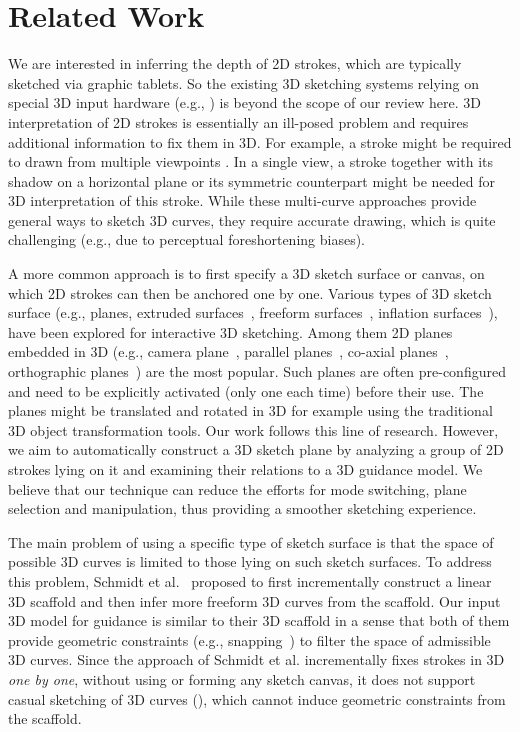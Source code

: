 \section{Related Work}
We are interested in inferring the depth of 2D strokes, which are typically sketched via graphic tablets. So the existing 3D sketching systems relying on special 3D input hardware (e.g., \cite{Sachs1991,Tsang2002}) is beyond the scope of our review here. 3D interpretation of 2D strokes is essentially an ill-posed problem and requires additional information to fix them in 3D. For example, a stroke might be required to drawn from multiple viewpoints \cite{Karpenko2004,bae2008ilovesketch,Rivers:2010}. %
In a single view, a stroke together with its shadow on a horizontal plane \cite{Cohen1999} or its symmetric counterpart \cite{bae2008ilovesketch} might be needed for 3D interpretation of this stroke. While these multi-curve approaches provide general ways to sketch 3D curves, they require accurate drawing, which is quite challenging (e.g., due to perceptual foreshortening biases).
%

A more common approach is to first specify a 3D sketch surface or canvas, on which 2D strokes can then be anchored one by one.
Various types of 3D sketch surface (e.g., planes, extruded surfaces~\cite{Tsang:2004,bae2008ilovesketch}, freeform surfaces~\cite{Kara2006,nealen2007fibermesh}, inflation surfaces~\cite{Grimm:2012}), have been explored for interactive 3D sketching. Among them 2D planes embedded in 3D (e.g., camera plane~\cite{bourguignon2001drawing}, parallel planes~\cite{dorsey2007mental}, co-axial planes~\cite{dorsey2007mental}, orthographic planes~\cite{Grossman2002,Tsang:2004,bae2008ilovesketch,Zheng2016}) are the most popular.
%
Such planes are often pre-configured and need to be explicitly activated (only one each time) before their use.
The planes might be translated and rotated in 3D for example using the traditional 3D object transformation tools.
%
Our work follows this line of research. However, we aim to automatically construct a 3D sketch plane by analyzing a group of 2D strokes lying on it and examining their relations to a 3D guidance model. We believe that our technique can reduce the efforts for mode switching, plane selection and manipulation, thus providing a smoother sketching experience.

The main problem of using a specific type of sketch surface is that the space of possible 3D curves is limited to those lying on such sketch surfaces. To address this problem, Schmidt et al.~ proposed to first incrementally construct a linear 3D scaffold and then infer more freeform 3D curves from the scaffold. Our input 3D model for guidance is similar to their 3D scaffold in a sense that both of them provide geometric constraints (e.g., snapping{~\cite{bier1990snap}})
to filter the space of admissible 3D curves. Since the approach of Schmidt et al. incrementally fixes strokes in 3D \emph{one by one}, without using or forming any sketch canvas, it does not support casual sketching of 3D curves (), which cannot induce geometric constraints from the scaffold.

